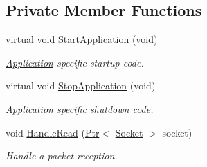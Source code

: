 \subsection*{Private Member Functions}
\begin{DoxyCompactItemize}
\item 
virtual void \hyperlink{classns3_1_1UdpEchoServer_a4c90329af8d6524862467808c3023786}{Start\+Application} (void)
\begin{DoxyCompactList}\small\item\em \hyperlink{classns3_1_1Application}{Application} specific startup code. \end{DoxyCompactList}\item 
virtual void \hyperlink{classns3_1_1UdpEchoServer_a5bc11ac1041c31c396cad3db5f42fb53}{Stop\+Application} (void)
\begin{DoxyCompactList}\small\item\em \hyperlink{classns3_1_1Application}{Application} specific shutdown code. \end{DoxyCompactList}\item 
void \hyperlink{classns3_1_1UdpEchoServer_adcb6eb00f837652d738d2357ef7c11a3}{Handle\+Read} (\hyperlink{classns3_1_1Ptr}{Ptr}$<$ \hyperlink{classns3_1_1Socket}{Socket} $>$ socket)
\begin{DoxyCompactList}\small\item\em Handle a packet reception. \end{DoxyCompactList}\end{DoxyCompactItemize}
